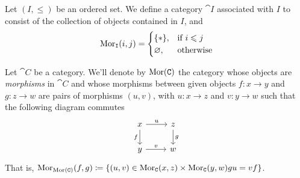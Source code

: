 \begin{example}
    \label{exp:order-category}
    Let \((I, \leq)\) be an ordered set. We define a category \(\cat I\)
    associated with \(I\) to consist of the collection of objects contained in
    \(I\), and
    \[
        \operatorname{Mor}_{\texttt I}(i, j) =
        \begin{cases}
            \{*\},     & \text{if } i \leqslant j \\
            \varnothing, & \text{otherwise}
        \end{cases}
    \]
\end{example}

\begin{definition}
    \label{def:morphism-category}
    Let \(\cat C\) be a category. We'll denote by \(\operatorname{Mor}(\texttt C)\) the category
    whose objects are \emph{morphisms} in \(\cat C\) and whose morphisms between
    given objects \(f: x \to y\) and \(g: z \to w\) are pairs of morphisms \((u,
    v)\), with \(u: x \to z\) and \(v: y \to w\) such that the following diagram
    commutes
    \[
        \begin{tikzcd}
            x \ar[d, swap, "f"] \ar[r, "u"] &z \ar[d, "g"] \\
            y \ar[r, "v"] &w
        \end{tikzcd}
    \]
    That is, \(\operatorname{Mor}_{\operatorname{Mor}(\texttt C)}(f, g) \coloneq \{(u, v) \in \operatorname{Mor}_{\texttt C}(x, z)
    \times \operatorname{Mor}_{\texttt C}(y, w) \relax g u = v f\}\).
\end{definition}


